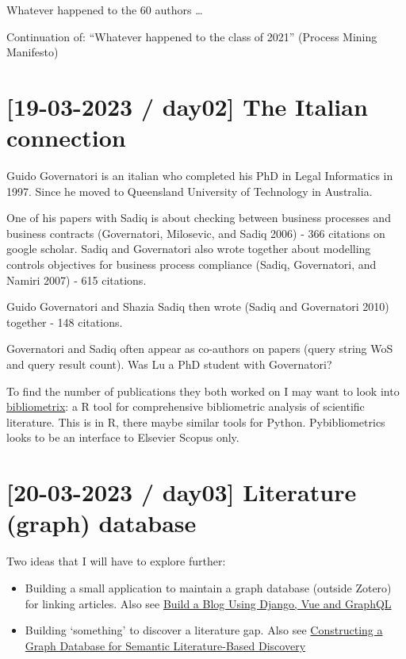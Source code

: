 \documentclass[
  letterpaper,
  DIV=11,
  numbers=noendperiod]{scrreprt}
\begin{document}
Whatever happened to the 60 authors \ldots{}

Continuation of: ``Whatever happened to the class of 2021'' (Process
Mining Manifesto)

\hypertarget{day02-the-italian-connection}{%
\section{{[}19-03-2023 / day02{]} The Italian
connection}\label{day02-the-italian-connection}}

Guido Governatori is an italian who completed his PhD in Legal
Informatics in 1997. Since he moved to Queensland University of
Technology in Australia.

One of his papers with Sadiq is about checking between business
processes and business contracts (Governatori, Milosevic, and Sadiq
2006) - 366 citations on google scholar. Sadiq and Governatori also
wrote together about modelling controls objectives for business process
compliance (Sadiq, Governatori, and Namiri 2007) - 615 citations.

Guido
Governatori
and Shazia Sadiq then wrote (Sadiq and Governatori 2010) together - 148
citations.

Governatori and
Sadiq
often appear as co-authors on papers (query string WoS and query result
count). Was Lu a PhD student with Governatori?

To find the number of publications they both worked on I may want to
look into \href{https://www.bibliometrix.org/home/}{bibliometrix}: a R
tool for comprehensive bibliometric analysis of scientific literature.
This is in R, there maybe similar tools for Python. Pybibliometrics
\href{}{} looks to be an interface to Elsevier Scopus only.

\hypertarget{day03-literature-graph-database}{%
\section{{[}20-03-2023 / day03{]} Literature (graph)
database}\label{day03-literature-graph-database}}

Two ideas that I will have to explore further:

\begin{itemize}
\item
  Building a small application to maintain a graph database (outside
  Zotero) for linking articles. Also see
  \href{https://realpython.com/python-django-blog}{Build a Blog Using
  Django, Vue and GraphQL}
\item
  Building `something' to discover a literature gap. Also see
  \href{https://pubmed.ncbi.nlm.nih.gov/26262393/}{Constructing a Graph
  Database for Semantic Literature-Based Discovery}
\end{itemize}
\end{document}
